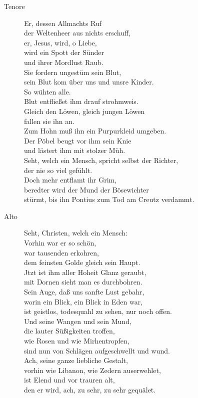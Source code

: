 \documentclass[parskip=full]{scrreprt}
\begin{document}
\begin{description}
  \item[Tenore]
  Er, dessen Allmachts Ruf\\
  der Weltenheer aus nichts erschuff,\\
  er, Jesus, wird, o Liebe,\\
  wird ein Spott der Sünder\\
  und ihrer Mordlust Raub.\\
  Sie fordern ungestüm sein Blut,\\
  sein Blut kom über uns und unsre Kinder.\\
  So wühten alle.\\
  Blut entfließet ihm drauf strohmweis.\\
  Gleich den Löwen, gleich jungen Löwen\\
  fallen sie ihn an.\\
  Zum Hohn muß ihn ein Purpurkleid umgeben.\\
  Der Pöbel beugt vor ihm sein Knie\\
  und lästert ihm mit stolzer Müh.\\
  Seht, welch ein Mensch, spricht selbst der Richter,\\
  der nie so viel gefühlt.\\
  Doch mehr entflamt ihr Grim,\\
  beredter wird der Mund der Bösewichter\\
  stürmt, bis ihn Pontius zum Tod am Creutz verdammt.

  \item[Alto]
  Seht, Christen, welch ein Mensch:\\
  Vorhin war er so schön,\\
  war tausenden erkohren,\\
  dem feinsten Golde gleich sein Haupt.\\
  Jtzt ist ihm aller Hoheit Glanz geraubt,\\
  mit Dornen sieht man es durchbohren.\\
  Sein Auge, daß uns sanfte Lust gebahr,\\
  worin ein Blick, ein Blick in Eden war,\\
  ist geistlos, todesquahl zu sehen, nur noch offen.\\
  Und seine Wangen und sein Mund,\\
  die lauter Süßigkeiten troffen,\\
  wie Rosen und wie Mirhentropfen,\\
  sind nun von Schlägen aufgeschwellt und wund.\\
  Ach, seine ganze liebliche Gestalt,\\
  vorhin wie Libanon, wie Zedern auserwehlet,\\
  ist Elend und vor trauren alt,\\
  den er wird, ach, zu sehr, zu sehr gequälet.
\end{description}
\end{document}
